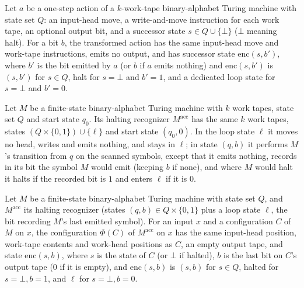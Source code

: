 \begin{definition}
\label{Complexity.acceptAction}
\leanok
{}
Let $a$ be a one-step action of a $k$-work-tape binary-alphabet Turing machine
with state set $Q$: an input-head move, a write-and-move instruction for each
work tape, an optional output bit, and a successor state $s \in Q \cup \{\bot\}$
($\bot$ meaning halt). For a bit $b$, the transformed action has the same
input-head move and work-tape instructions, emits no output, and has successor
state $\mathrm{enc}(s, b')$, where $b'$ is the bit emitted by $a$ (or $b$ if $a$
emits nothing) and $\mathrm{enc}(s, b')$ is $(s, b')$ for $s \in Q$, halt for
$s = \bot$ and $b' = 1$, and a dedicated loop state for $s = \bot$ and $b' = 0$.
\end{definition}

\begin{definition}
\label{Complexity.acceptTM}
\leanok
{}
Let $M$ be a finite-state binary-alphabet Turing machine with $k$ work tapes,
state set $Q$ and start state $q_0$. Its halting recognizer $M^{\mathrm{acc}}$
has the same $k$ work tapes, states $(Q \times \{0,1\}) \cup \{\ell\}$ and start
state $(q_0, 0)$. In the loop state $\ell$ it moves no head, writes and emits
nothing, and stays in $\ell$; in state $(q, b)$ it performs $M$'s transition from
$q$ on the scanned symbols, except that it emits nothing, records in its bit the
symbol $M$ would emit (keeping $b$ if none), and where $M$ would halt it halts if
the recorded bit is $1$ and enters $\ell$ if it is $0$.
\end{definition}

\begin{definition}
\label{Complexity.acceptCfg}
\leanok
{}
Let $M$ be a finite-state binary-alphabet Turing machine with state set $Q$, and
$M^{\mathrm{acc}}$ its halting recognizer (states $(q,b) \in Q \times \{0,1\}$
plus a loop state $\ell$, the bit recording $M$'s last emitted symbol). For an
input $x$ and a configuration $C$ of $M$ on $x$, the configuration $\Phi(C)$ of
$M^{\mathrm{acc}}$ on $x$ has the same input-head position, work-tape contents
and work-head positions as $C$, an empty output tape, and state
$\mathrm{enc}(s, b)$, where $s$ is the state of $C$ (or $\bot$ if halted), $b$ is
the last bit on $C$'s output tape ($0$ if it is empty), and $\mathrm{enc}(s,b)$
is $(s,b)$ for $s \in Q$, halted for $s=\bot, b=1$, and $\ell$ for
$s=\bot, b=0$.
\end{definition}

